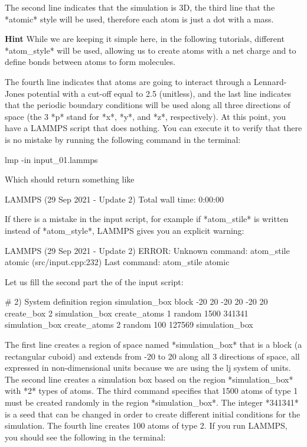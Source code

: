 The second line indicates that the simulation
is 3D, the third line that the *atomic* style
will be used, therefore each atom is just a dot with a mass.


\textbf{Hint} While we are keeping it simple here,
in the following tutorials, different *atom_style* will be used,
allowing us to create atoms with a net charge and to define 
bonds between atoms to form molecules.


The fourth line indicates that atoms are going to interact
through a Lennard-Jones potential with a cut-off equal to
2.5 (unitless), and the last line indicates that the
periodic boundary conditions will be used along all three
directions of space (the 3 *p* stand for *x*, *y*, and *z*,
respectively).
At this point, you have a LAMMPS script that does nothing.
You can execute it to verify that there is no mistake by
running the following command in the terminal:



\begin{lcverbatim}
lmp -in input_01.lammps
\end{lcverbatim}

Which should return something like



\begin{lcverbatim}
LAMMPS (29 Sep 2021 - Update 2)
Total wall time: 0:00:00
\end{lcverbatim}

If there is a mistake in the input script, for example if
*atom_stile* is written instead of *atom_style*, LAMMPS
gives you an explicit warning:



\begin{lcverbatim}
LAMMPS (29 Sep 2021 - Update 2)
ERROR: Unknown command: atom_stile  atomic (src/input.cpp:232)
Last command: atom_stile atomic
\end{lcverbatim}

Let us fill the second part the of the input script:



\begin{lcverbatim}
# 2) System definition
region simulation_box block -20 20 -20 20 -20 20
create_box 2 simulation_box
create_atoms 1 random 1500 341341 simulation_box
create_atoms 2 random 100 127569 simulation_box
\end{lcverbatim}

The first line creates a region of space
named *simulation_box* that is a block (a rectangular cuboid) and
extends from -20 to 20 along all 3 directions of space, all expressed in
non-dimensional units because we are using the lj system
of units. The second line creates a simulation box based on
the region *simulation_box* with *2* types of atoms. The third
command specifies that 1500 atoms of type 1 must be created
randomly in the region *simulation_box*. The integer *341341* is a
seed that can be changed in order to create different
initial conditions for the simulation. The fourth line
creates 100 atoms of type 2.
If you run LAMMPS, you should see the following in the
terminal:



